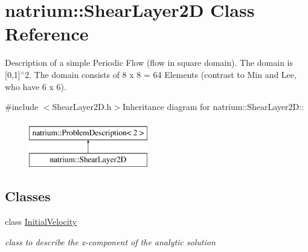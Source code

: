 \hypertarget{classnatrium_1_1ShearLayer2D}{
\section{natrium::ShearLayer2D Class Reference}
\label{classnatrium_1_1ShearLayer2D}
}


Description of a simple Periodic Flow (flow in square domain). The domain is \mbox{[}0,1\mbox{]}$^\wedge$2. The domain consists of 8 x 8 = 64 Elements (contrast to Min and Lee, who have 6 x 6).  


{\ttfamily \#include $<$ShearLayer2D.h$>$}Inheritance diagram for natrium::ShearLayer2D::\begin{figure}[H]
\begin{center}
\leavevmode
\includegraphics[height=2cm]{classnatrium_1_1ShearLayer2D}
\end{center}
\end{figure}
\subsection*{Classes}
\begin{DoxyCompactItemize}
\item 
class \hyperlink{classnatrium_1_1ShearLayer2D_1_1InitialVelocity}{InitialVelocity}
\begin{DoxyCompactList}\small\item\em class to describe the x-\/component of the analytic solution \item\end{DoxyCompactList}\end{DoxyCompactItemize}
